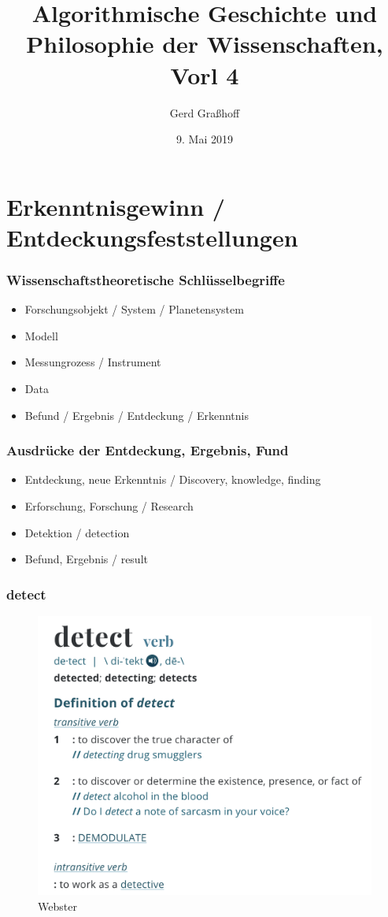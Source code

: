 \documentclass[11pt]{beamer}
\author{Gerd Graßhoff}
\title{Algorithmische Geschichte und Philosophie der Wissenschaften, Vorl 4}
\date{9. Mai 2019}
\begin{document}
	\begin{frame}[plain]
		\maketitle
	\end{frame}
	

\section{Erkenntnisgewinn / Entdeckungsfeststellungen}

	\begin{frame}
	\frametitle{Wissenschaftstheoretische Schlüsselbegriffe}
	\begin{itemize}
		\item Forschungsobjekt / System / Planetensystem
		\item Modell
		\item Messungrozess / Instrument
		\item Data
		\item Befund / Ergebnis / Entdeckung / Erkenntnis
	\end{itemize}
\end{frame}

	\begin{frame}
	\frametitle{Ausdrücke der Entdeckung, Ergebnis, Fund}
	\begin{itemize}
		\item Entdeckung, neue Erkenntnis / Discovery, knowledge, finding
		\item Erforschung, Forschung / Research 
		\item Detektion / detection
		\item Befund, Ergebnis / result 
	\end{itemize}
\end{frame}

	\begin{frame}
	\frametitle{detect}
\begin{figure}
	\centering
	\includegraphics[width=0.7\linewidth]{screenshot001}
	\caption{Webster}
	\label{fig:screenshot001}
\end{figure}
\end{frame}
\end{document}
